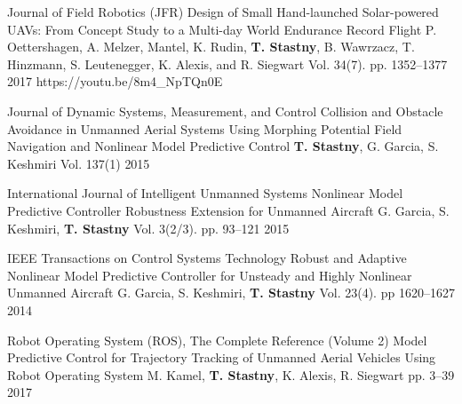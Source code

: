 \begin{cventries}
\begin{cvnumlist}
\item \cvpubentry
	{Journal of Field Robotics (JFR)} %
	{Design of Small Hand-launched Solar-powered UAVs: From Concept Study to a Multi-day World Endurance Record Flight} %
	{P. Oettershagen, A. Melzer, Mantel, K. Rudin, \textbf{T. Stastny}, B. Wawrzacz, T. Hinzmann, S. Leutenegger, K. Alexis, and R. Siegwart} %
	{Vol. 34(7). pp. 1352--1377} %
	{2017} %
	{https://youtu.be/8m4\_NpTQn0E} %
	{} %

\item \cvpubentry
	{Journal of Dynamic Systems, Measurement, and Control} %
	{Collision and Obstacle Avoidance in Unmanned Aerial Systems Using Morphing Potential Field Navigation and Nonlinear Model Predictive Control} %
	{\textbf{T. Stastny}, G. Garcia, S. Keshmiri} %
	{Vol. 137(1)} %
	{2015} %
	{} %
	{} %
	
\item \cvpubentry
	{International Journal of Intelligent Unmanned Systems} %
	{Nonlinear Model Predictive Controller Robustness Extension for Unmanned Aircraft} %
	{G. Garcia, S. Keshmiri, \textbf{T. Stastny}} %
	{Vol. 3(2/3). pp. 93--121} %
	{2015} %
	{} %
	{} %

\item \cvpubentry
	{IEEE Transactions on Control Systems Technology} %
	{Robust and Adaptive Nonlinear Model Predictive Controller for Unsteady and Highly Nonlinear Unmanned Aircraft} %
	{G. Garcia, S. Keshmiri, \textbf{T. Stastny}} %
	{Vol. 23(4). pp 1620--1627} %
	{2014} %
	{} %
	{} %
%
\end{cvnumlist}


\begin{flushleft}
\end{flushleft}

\begin{cvnumlist}
%
\item \cvpubentry
	{Robot Operating System (ROS), The Complete Reference (Volume 2)} %
	{Model Predictive Control for Trajectory Tracking of Unmanned Aerial Vehicles Using Robot Operating System} %
	{M. Kamel, \textbf{T. Stastny}, K. Alexis, R. Siegwart} %
	{pp. 3--39} %
	{2017} %
	{} %
	{} %
%
\end{cvnumlist}


\end{cventries}
